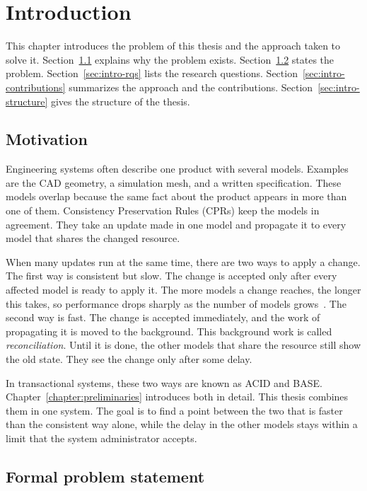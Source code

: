 
\chapter{Introduction}\label{chapter:introduction}

This chapter introduces the problem of this thesis and the approach taken to
solve it. Section~\ref{sec:intro-motivation} explains why the problem exists.
Section~\ref{sec:intro-problem} states the problem. Section~\ref{sec:intro-rqs}
lists the research questions. Section~\ref{sec:intro-contributions} summarizes
the approach and the contributions. Section~\ref{sec:intro-structure} gives the
structure of the thesis.


\section{Motivation}\label{sec:intro-motivation}

Engineering systems often describe one product with several models. Examples are
the CAD geometry, a simulation mesh, and a written specification. These models
overlap because the same fact about the product appears in more than one of
them. Consistency Preservation Rules (CPRs) keep the models in agreement. They
take an update made in one model and propagate it to every model that shares the
changed resource.


When many updates run at the same time, there are two ways to apply a change.
The first way is consistent but slow. The change is accepted only after every
affected model is ready to apply it. The more models a change reaches, the
longer this takes, so performance drops sharply as the number of models
grows~\cite{zacouris2026mxs}. The second way is fast. The change is accepted
immediately, and the work of propagating it is moved to the background. This
background work is called \emph{reconciliation}. Until it is done, the other
models that share the resource still show the old state. They see the change
only after some delay.

In transactional systems, these two ways are known as ACID and BASE.
Chapter~\ref{chapter:preliminaries} introduces both in detail. This thesis
combines them in one system. The goal is to find a point between the two that is
faster than the consistent way alone, while the delay in the other models stays
within a limit that the system administrator accepts.

\section{Formal problem statement}\label{sec:intro-problem}\label{sec:intro-formal}

